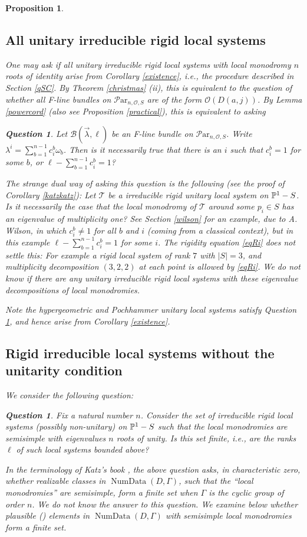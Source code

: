 \documentclass[11pt]{amsart}
\newcommand\op{\operatorname}
\newcommand\Par{\mathcal{P}\text{ar} }
\newtheorem{question}[theorem]{Question}
\newtheorem{proposition}[theorem]{Proposition}
\numberwithin{theorem}{subsection}
\begin{document}
{\begin{proposition}
\subsection{All unitary irreducible rigid local systems}\label{qSC2}
  One may ask if all unitary irreducible rigid local systems with local monodromy $n$ roots of identity arise from Corollary \ref{existence}, i.e., the procedure described in Section \ref{qSC}. By Theorem \ref{christmas} (ii), this is equivalent to the question  of whether all F-line bundles on $\Par_{n,\mathcal{O},S}$ are of the form $\mathcal{O}(D(a,j))$. By Lemma \ref{powercord} (also see Proposition  \ref{practical}), this is equivalent to asking
\begin{question}\label{Q}
Let $\mathcal{B}(\vec{\lambda},\ell)$ be an F-line bundle on $\Par_{n,\mathcal{O},S}$. Write $\lambda^i=\sum_{b=1}^{n -1} c^b_i\omega_b$. Then is it necessarily true that  there is an $i$ such that
$c^b_i=1$ for some $b$, or $\ell -\sum_{b=1}^{n-1} c^b_i=1$?
\end{question}
The strange dual way of asking this question is the following (see the proof of Corollary \ref{katzkatz}): Let $\mathcal{T}$ be a irreducible rigid unitary local system on $\Bbb{P}^1-S$. Is it necessarily the case that the local monodromy of $\mathcal{T}$ around some $p_i\in S$ has an eigenvalue of multiplicity one? See Section \ref{wilson} for an example, due to A. Wilson, in which
$c^b_i\neq 1$ for all $b$ and $i$ (coming from a classical context), but in this example  $\ell -\sum_{b=1}^{n-1} c^b_i=1$ for some $i$. The rigidity equation \eqref{eqRi} does not settle this:
For example a rigid local system of rank $7$ with $|S|=3$, and multiplicity decomposition $(3,2,2)$
at each point is allowed by \eqref{eqRi}. We do not know if there are any unitary irreducible rigid local systems with these eigenvalue decompositions of local monodromies.

Note the hypergeometric and Pochhammer unitary local systems satisfy Question
\ref{Q}, and hence arise from Corollary \ref{existence}.

\subsection{Rigid irreducible local systems without the unitarity condition}\label{afterN}
We consider the following question:
\begin{question} Fix a natural number $n$. Consider the set of  irreducible rigid local systems (possibly non-unitary) on $\Bbb{P}^1-S$  such that the local  monodromies are semisimple with eigenvalues $n$ roots of unity.
Is this set finite, i.e., are the ranks $\ell$ of such local systems bounded above?
\end{question}
In the terminology of Katz's book \cite[Section 6.1]{Katz},  the above question asks, in characteristic zero,  whether  realizable  classes in $\op{NumData}(D,\Gamma)$, such that the ``local monodromies'' are semisimple, form a finite set when $\Gamma$ is the cyclic group of order $n$. We do not know the answer to this question.  We examine  below whether plausible (\cite[Definition  6.3.3]{Katz}) elements  in $\op{NumData}(D,\Gamma)$ with semisimple local monodromies form a finite set.



\end{proposition}}
\end{document}
